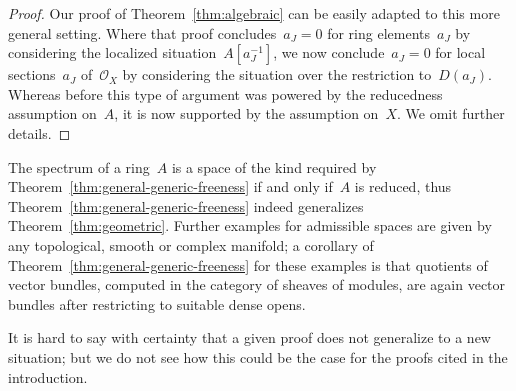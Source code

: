 \documentclass[oneside]{amsart}
\theoremstyle{definition}
\theoremstyle{plain}
\theoremstyle{remark}
\renewcommand{\O}{\mathcal{O}}
\begin{document}

\begin{proof}Our proof of Theorem~\ref{thm:algebraic} can be easily adapted to
this more general setting. Where that proof concludes~$a_J = 0$ for ring
elements~$a_J$ by considering the localized situation~$A[a_J^{-1}]$, we now
conclude~$a_J = 0$ for local sections~$a_J$ of~$\O_X$ by considering the
situation over the restriction to~$D(a_J)$. Whereas before this type of argument was
powered by the reducedness assumption on~$A$, it is now supported by the
assumption on~$X$.
We omit further details.
\end{proof}

The spectrum of a ring~$A$ is a space of the kind required by
Theorem~\ref{thm:general-generic-freeness} if and only if~$A$ is reduced,
thus Theorem~\ref{thm:general-generic-freeness} indeed
generalizes Theorem~\ref{thm:geometric}. Further examples for admissible spaces
are given by any topological, smooth or complex manifold; a corollary
of Theorem~\ref{thm:general-generic-freeness} for these examples is that
quotients of vector bundles, computed in the category of sheaves of modules,
are again vector bundles after restricting to suitable dense opens.

It is hard to say with certainty that a given proof does not generalize to a
new situation; but we do not see how this could be the case for the proofs
cited in the introduction.


\printbibliography
\end{document}
